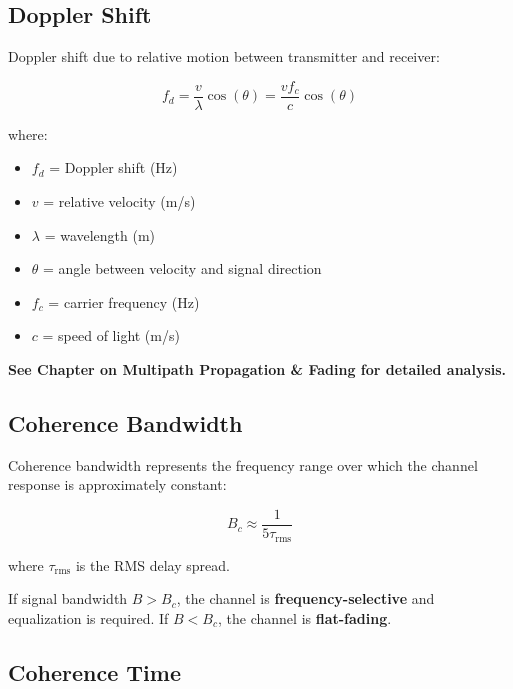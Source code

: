 \subsection{Doppler Shift}
\label{subsec:doppler-shift}

Doppler shift due to relative motion between transmitter and receiver:

\begin{equation}
\label{eq:doppler-shift}
f_d = \frac{v}{\lambda} \cos(\theta) = \frac{vf_c}{c} \cos(\theta)
\end{equation}

where:
\begin{itemize}
\item $f_d$ = Doppler shift (Hz)
\item $v$ = relative velocity (m/s)
\item $\lambda$ = wavelength (m)
\item $\theta$ = angle between velocity and signal direction
\item $f_c$ = carrier frequency (Hz)
\item $c$ = speed of light (m/s)
\end{itemize}

\textbf{See Chapter on Multipath Propagation \& Fading for detailed analysis.}

\subsection{Coherence Bandwidth}
\label{subsec:coherence-bandwidth}

Coherence bandwidth represents the frequency range over which the channel response is approximately constant:

\begin{equation}
\label{eq:coherence-bandwidth}
B_c \approx \frac{1}{5\tau_{\text{rms}}}
\end{equation}

where $\tau_{\text{rms}}$ is the RMS delay spread.

\begin{importantbox}
If signal bandwidth $B > B_c$, the channel is \textbf{frequency-selective} and equalization is required. If $B < B_c$, the channel is \textbf{flat-fading}.
\end{importantbox}

\subsection{Coherence Time}
\label{subsec:coherence-time}


